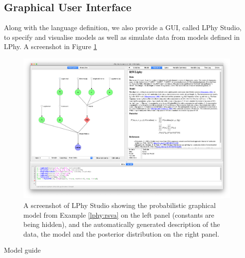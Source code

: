 \documentclass[10pt,letterpaper,table]{article}
\begin{document}
{\subsection*{Graphical User Interface}
Along with the language definition, we also provide a GUI, called LPhy Studio, to specify and visualise models as well as simulate data from models defined in LPhy. A screenshot in Figure \ref{fig:lphystudio} 

\begin{figure}
  \includegraphics[width=\textwidth]{figs/lphystudio_screenshot.png}
  \caption{A screenshot of LPhy Studio showing the probabilistic
    graphical model from Example \ref{lphy:rsva} on the left panel
    (constants are being hidden), and the automatically generated
    description of the data, the model and the posterior
    distribution on the right panel.} 
  \label{fig:lphystudio}
\end{figure}

Model guide

}
\end{document}
